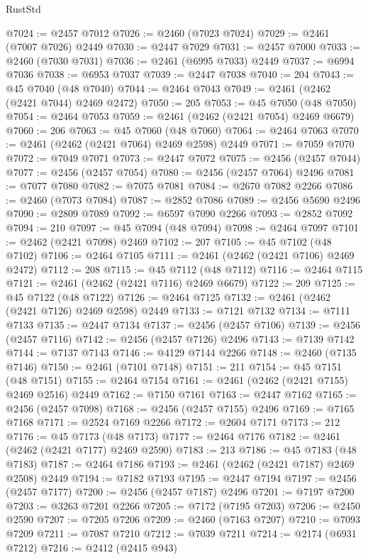 \begin{lexlean}{RustStd}
\begin{coremodule}
@7024 := @2457 @7012
@7026 := @2460 (@7023 @7024)
@7029 := @2461 (@7007 @7026) @2449
@7030 := @2447 @7029
@7031 := @2457 @7000
@7033 := @2460 (@7030 @7031)
@7036 := @2461 (@6995 @7033) @2449
@7037 := @6994 @7036
@7038 := @6953 @7037
@7039 := @2447 @7038
@7040 := 204
@7043 := @45 @7040 (@48 @7040)
@7044 := @2464 @7043
@7049 := @2461 (@2462 (@2421 @7044) @2469 @2472)
@7050 := 205
@7053 := @45 @7050 (@48 @7050)
@7054 := @2464 @7053
@7059 := @2461 (@2462 (@2421 @7054) @2469 @6679)
@7060 := 206
@7063 := @45 @7060 (@48 @7060)
@7064 := @2464 @7063
@7070 := @2461 (@2462 (@2421 @7064) @2469 @2598) @2449
@7071 := @7059 @7070
@7072 := @7049 @7071
@7073 := @2447 @7072
@7075 := @2456 (@2457 @7044)
@7077 := @2456 (@2457 @7054)
@7080 := @2456 (@2457 @7064) @2496
@7081 := @7077 @7080
@7082 := @7075 @7081
@7084 := @2670 @7082 @2266
@7086 := @2460 (@7073 @7084)
@7087 := @2852 @7086
@7089 := @2456 @5690 @2496
@7090 := @2809 @7089
@7092 := @6597 @7090 @2266
@7093 := @2852 @7092
@7094 := 210
@7097 := @45 @7094 (@48 @7094)
@7098 := @2464 @7097
@7101 := @2462 (@2421 @7098) @2469
@7102 := 207
@7105 := @45 @7102 (@48 @7102)
@7106 := @2464 @7105
@7111 := @2461 (@2462 (@2421 @7106) @2469 @2472)
@7112 := 208
@7115 := @45 @7112 (@48 @7112)
@7116 := @2464 @7115
@7121 := @2461 (@2462 (@2421 @7116) @2469 @6679)
@7122 := 209
@7125 := @45 @7122 (@48 @7122)
@7126 := @2464 @7125
@7132 := @2461 (@2462 (@2421 @7126) @2469 @2598) @2449
@7133 := @7121 @7132
@7134 := @7111 @7133
@7135 := @2447 @7134
@7137 := @2456 (@2457 @7106)
@7139 := @2456 (@2457 @7116)
@7142 := @2456 (@2457 @7126) @2496
@7143 := @7139 @7142
@7144 := @7137 @7143
@7146 := @4129 @7144 @2266
@7148 := @2460 (@7135 @7146)
@7150 := @2461 (@7101 @7148)
@7151 := 211
@7154 := @45 @7151 (@48 @7151)
@7155 := @2464 @7154
@7161 := @2461 (@2462 (@2421 @7155) @2469 @2516) @2449
@7162 := @7150 @7161
@7163 := @2447 @7162
@7165 := @2456 (@2457 @7098)
@7168 := @2456 (@2457 @7155) @2496
@7169 := @7165 @7168
@7171 := @2524 @7169 @2266
@7172 := @2604 @7171
@7173 := 212
@7176 := @45 @7173 (@48 @7173)
@7177 := @2464 @7176
@7182 := @2461 (@2462 (@2421 @7177) @2469 @2590)
@7183 := 213
@7186 := @45 @7183 (@48 @7183)
@7187 := @2464 @7186
@7193 := @2461 (@2462 (@2421 @7187) @2469 @2508) @2449
@7194 := @7182 @7193
@7195 := @2447 @7194
@7197 := @2456 (@2457 @7177)
@7200 := @2456 (@2457 @7187) @2496
@7201 := @7197 @7200
@7203 := @3263 @7201 @2266
@7205 := @7172 (@7195 @7203)
@7206 := @2450 @2590
@7207 := @7205 @7206
@7209 := @2460 (@7163 @7207)
@7210 := @7093 @7209
@7211 := @7087 @7210
@7212 := @7039 @7211
@7214 := @2174 (@6931 @7212)
@7216 := @2412 (@2415 @943)

\end{coremodule}
\end{lexlean}
